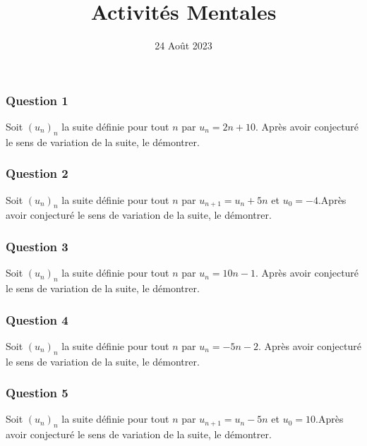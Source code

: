 \documentclass[15pt, mathserif]{beamer}
\title{Activités Mentales}
\date{24 Août 2023}
\begin{document}
\begin{frame}
    \titlepage
\end{frame}

\begin{frame} 
	\frametitle{Question 1}
Soit $(u_n)_n$ la suite définie pour tout $n$ par $u_n=2n+10$. Après avoir conjecturé le sens de variation de la suite, le démontrer.\end{frame}


\begin{frame} 
	\frametitle{Question 2}
  
 Soit $(u_n)_n$ la suite définie pour tout $n$ par $u_{n+1}=u_n+5n$ et $u_0= -4$.Après avoir conjecturé le sens de variation de la suite, le démontrer.\end{frame}


\begin{frame} 
	\frametitle{Question 3}
Soit $(u_n)_n$ la suite définie pour tout $n$ par $u_n=10n-1$. Après avoir conjecturé le sens de variation de la suite, le démontrer.\end{frame}


\begin{frame} 
	\frametitle{Question 4}
Soit $(u_n)_n$ la suite définie pour tout $n$ par $u_n=-5n-2$. Après avoir conjecturé le sens de variation de la suite, le démontrer.\end{frame}


\begin{frame} 
	\frametitle{Question 5}
  
 Soit $(u_n)_n$ la suite définie pour tout $n$ par $u_{n+1}=u_n-5n$ et $u_0= 10$.Après avoir conjecturé le sens de variation de la suite, le démontrer.\end{frame}
\end{document}
